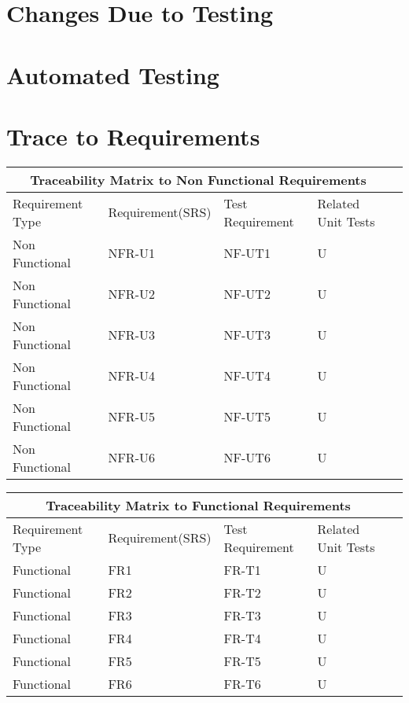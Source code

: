 \documentclass[12pt, titlepage]{article}
\begin{document}
\section{Changes Due to Testing}

\section{Automated Testing}
		
\section{Trace to Requirements}
\begin{tabular}{ |p{3cm}||p{4cm}|p{4cm}|p{4cm}|p{4cm}| }
  \hline
  \multicolumn{4}{|c|}{Traceability Matrix to Non Functional Requirements} \\
  \hline
  Requirement Type & Requirement(SRS) & Test Requirement & Related Unit Tests \\
  \hline
  Non Functional   & NFR-U1  & NF-UT1 & U \\ \hline
  Non Functional   & NFR-U2  & NF-UT2 & U \\ \hline
  Non Functional   & NFR-U3  & NF-UT3 & U \\ \hline
  Non Functional   & NFR-U4  & NF-UT4 & U \\ \hline
  Non Functional   & NFR-U5  & NF-UT5 & U \\ \hline
  Non Functional   & NFR-U6  & NF-UT6 & U \\ \hline
  
 \end{tabular}

 \begin{tabular}{ |p{3cm}||p{4cm}|p{4cm}|p{4cm}|p{4cm}| }
  \hline
  \multicolumn{4}{|c|}{Traceability Matrix to Functional Requirements} \\
  \hline
  Requirement Type & Requirement(SRS) & Test Requirement & Related Unit Tests \\
  \hline
  Functional   & FR1  & FR-T1 & U \\ \hline
  Functional   & FR2  & FR-T2 & U \\ \hline
  Functional   & FR3  & FR-T3 & U \\ \hline
  Functional   & FR4  & FR-T4 & U \\ \hline
  Functional   & FR5  & FR-T5 & U \\ \hline
  Functional   & FR6  & FR-T6 & U \\ \hline
  
 \end{tabular}
		
\end{document}
